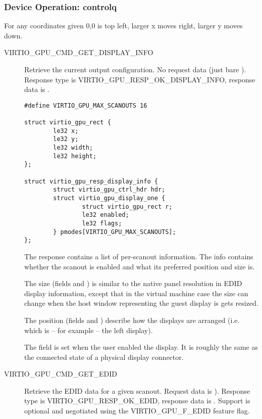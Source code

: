 \subsubsection{Device Operation: controlq}\label{sec:Device Types / GPU Device / Device Operation / Device Operation: controlq}

For any coordinates given 0,0 is top left, larger x moves right,
larger y moves down.

\begin{description}

\item[VIRTIO_GPU_CMD_GET_DISPLAY_INFO] Retrieve the current output
  configuration.  No request data (just bare ).  Response type is
  VIRTIO_GPU_RESP_OK_DISPLAY_INFO, response data is .

\begin{lstlisting}
#define VIRTIO_GPU_MAX_SCANOUTS 16

struct virtio_gpu_rect {
        le32 x;
        le32 y;
        le32 width;
        le32 height;
};

struct virtio_gpu_resp_display_info {
        struct virtio_gpu_ctrl_hdr hdr;
        struct virtio_gpu_display_one {
                struct virtio_gpu_rect r;
                le32 enabled;
                le32 flags;
        } pmodes[VIRTIO_GPU_MAX_SCANOUTS];
};
\end{lstlisting}

The response contains a list of per-scanout information.  The info
contains whether the scanout is enabled and what its preferred
position and size is.

The size (fields  and ) is similar to the
native panel resolution in EDID display information, except that in
the virtual machine case the size can change when the host window
representing the guest display is gets resized.

The position (fields  and ) describe how the
displays are arranged (i.e. which is -- for example -- the left
display).

The  field is set when the user enabled the display.
It is roughly the same as the connected state of a physical display
connector.

\item[VIRTIO_GPU_CMD_GET_EDID] Retrieve the EDID data for a given
  scanout.  Request data is ).
  Response type is VIRTIO_GPU_RESP_OK_EDID, response data is
  .  Support is optional and
  negotiated using the VIRTIO_GPU_F_EDID feature flag.


\end{description}
